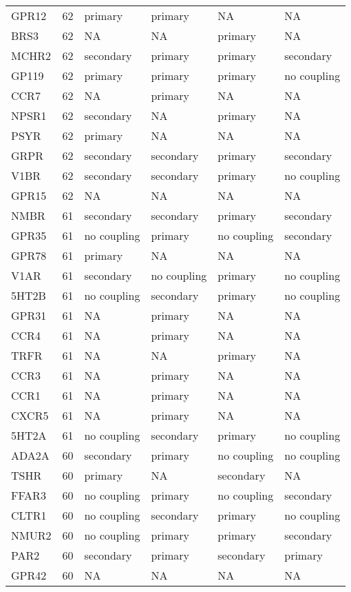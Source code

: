 \begin{longtable}{lrllll}
GPR12 & 62 & primary & primary & NA & NA\\
BRS3 & 62 & NA & NA & primary & NA\\
\addlinespace
MCHR2 & 62 & secondary & primary & primary & secondary\\
GP119 & 62 & primary & primary & primary & no coupling\\
CCR7 & 62 & NA & primary & NA & NA\\
NPSR1 & 62 & secondary & NA & primary & NA\\
PSYR & 62 & primary & NA & NA & NA\\
\addlinespace
GRPR & 62 & secondary & secondary & primary & secondary\\
V1BR & 62 & secondary & secondary & primary & no coupling\\
GPR15 & 62 & NA & NA & NA & NA\\
NMBR & 61 & secondary & secondary & primary & secondary\\
GPR35 & 61 & no coupling & primary & no coupling & secondary\\
\addlinespace
GPR78 & 61 & primary & NA & NA & NA\\
V1AR & 61 & secondary & no coupling & primary & no coupling\\
5HT2B & 61 & no coupling & secondary & primary & no coupling\\
GPR31 & 61 & NA & primary & NA & NA\\
CCR4 & 61 & NA & primary & NA & NA\\
\addlinespace
TRFR & 61 & NA & NA & primary & NA\\
CCR3 & 61 & NA & primary & NA & NA\\
CCR1 & 61 & NA & primary & NA & NA\\
CXCR5 & 61 & NA & primary & NA & NA\\
5HT2A & 61 & no coupling & secondary & primary & no coupling\\
\addlinespace
ADA2A & 60 & secondary & primary & no coupling & no coupling\\
TSHR & 60 & primary & NA & secondary & NA\\
FFAR3 & 60 & no coupling & primary & no coupling & secondary\\
CLTR1 & 60 & no coupling & secondary & primary & no coupling\\
NMUR2 & 60 & no coupling & primary & primary & secondary\\
\addlinespace
PAR2 & 60 & secondary & primary & secondary & primary\\
GPR42 & 60 & NA & NA & NA & NA\\

\end{longtable}
